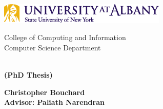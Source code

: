 \noindent
\begin{minipage}{3.2in}
    \includegraphics[width=3.15in]{images/logo_A2_pms124_269.eps}
\end{minipage}
\hspace{\fill}
\begin{minipage}{2.3in}
    \setlength{\baselineskip}{13pt}
    \makebox{\ } \hfill {\footnotesize College of Computing and Information} \\
    \makebox{\ } \hfill {\footnotesize Computer Science Department}
\end{minipage}

\vspace*{2in}
\begin{center}
    \begin{minipage}{0.75\textwidth}
        \centering
        \textbf{\huge \thetitle} \\[+15pt]
        \textbf{(PhD Thesis)}
    \end{minipage}
\end{center}

\vspace*{1.5in}
\begin{center}
    \textbf{\large Christopher Bouchard} \\[+5pt]
    \textbf{\large Advisor: Paliath Narendran } \\[+5pt]
    \textbf{\large \thedate}
\end{center}

